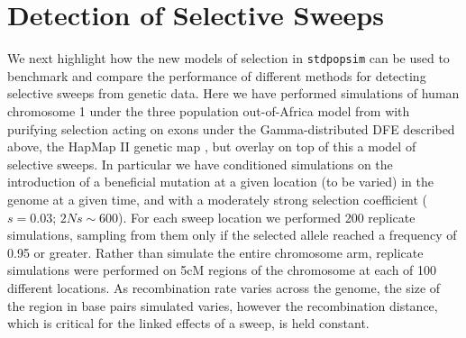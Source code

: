 \documentclass[hidelinks]{article}
\newcommand{\stdpopsim}{\texttt{stdpopsim}\xspace}
\begin{document}
\section*{Detection of Selective Sweeps}
    \label{sweeps}
    We next highlight how the new models of selection in \stdpopsim can be used to benchmark and compare
    the performance of different methods for detecting selective sweeps from genetic data. 
    Here we have performed simulations of human chromosome 1 under the three population out-of-Africa model from \cite{gutenkunst2009inferring}
    with purifying selection acting on exons under the Gamma-distributed DFE described above, the HapMap II genetic map \citep{international2007second},    
    but overlay on top of this a model of selective sweeps. In particular we have conditioned simulations on the introduction of a beneficial mutation
    at a given location (to be varied) in the genome at a given time, and with a moderately strong selection coefficient ($s = 0.03$; $2Ns \sim 600$).
    For each sweep location we performed 200 replicate simulations, sampling from them only if the selected allele reached a frequency of
    0.95 or greater. Rather than simulate the entire chromosome arm, replicate simulations were performed on 5cM regions of the chromosome
    at each of 100 different locations. As recombination rate varies across the genome, the size of the region in base pairs simulated varies,
    however the recombination distance, which is critical for the linked effects of a sweep, is held constant.
  
\end{document}
